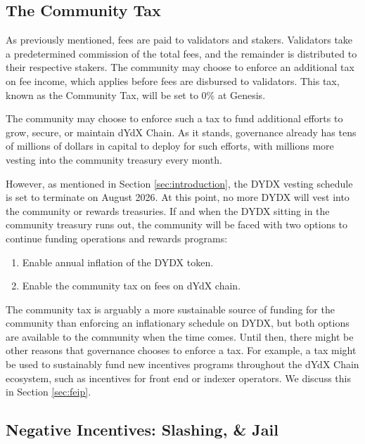         \subsection{The Community Tax}

            As previously mentioned, fees are paid to validators and stakers. Validators take a predetermined commission of the total fees, and the remainder is distributed to their respective stakers. The community may choose to enforce an additional tax on fee income, which applies before fees are disbursed to validators. This tax, known as the Community Tax, will be set to 0\% at Genesis.

            The community may choose to enforce such a tax to fund additional efforts to grow, secure, or maintain dYdX Chain. As it stands, governance already has tens of millions of dollars in capital to deploy for such efforts, with millions more vesting into the community treasury every month. 

            However, as mentioned in Section \ref{sec:introduction}, the DYDX vesting schedule is set to terminate on August 2026. At this point, no more DYDX will vest into the community or rewards treasuries. If and when the DYDX sitting in the community treasury runs out, the community will be faced with two options to continue funding operations and rewards programs:

            \begin{enumerate}
                \item Enable annual inflation of the DYDX token.
                \item Enable the community tax on fees on dYdX chain.
            \end{enumerate}

            The community tax is arguably a more sustainable source of funding for the community than enforcing an inflationary schedule on DYDX, but both options are available to the community when the time comes. Until then, there might be other reasons that governance chooses to enforce a tax. For example, a tax might be used to sustainably fund new incentives programs throughout the dYdX Chain ecosystem, such as incentives for front end or indexer operators. We discuss this in Section \ref{sec:feip}.

    \subsection{Negative Incentives: Slashing, \& Jail} \label{subsec:mev}

